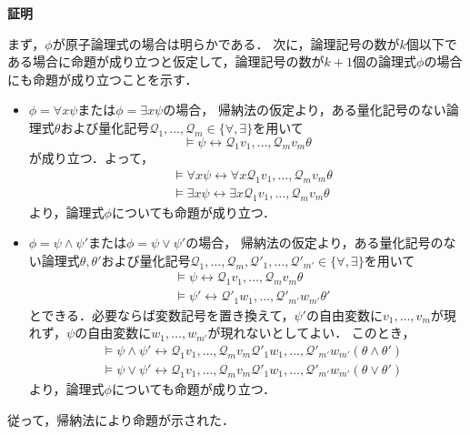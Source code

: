 \documentclass[uplatex, dvipdfmx]{jsarticle}
\makeatletter
\numberwithin{equation}{section}
\renewenvironment{proof}[1][\proofname]{\par
  \pushQED{\qed}%
  \normalfont \topsep6\p@\@plus6\p@\relax
  \trivlist
  \item\relax
  {\bfseries
  #1\@addpunct{.}}\hspace\labelsep\ignorespaces
}{
  \popQED\endtrivlist\@endpefalse
}
\newcommand{\Qua}{\mathcal{Q}}
\theoremstyle{definition}
\renewcommand{\proofname}{\textbf{証明}}
\makeatother
\begin{document}
\begin{proof}
     まず，$\phi$が原子論理式の場合は明らかである．
     次に，論理記号の数が$k$個以下である場合に命題が成り立つと仮定して，論理記号の数が$k+1$個の論理式$\phi$の場合にも命題が成り立つことを示す．
     \begin{itemize}
          \item
               $\phi = \forall x \psi$または$\phi = \exists x \psi$の場合，
               帰納法の仮定より，ある量化記号のない論理式$\theta$および量化記号$\Qua_1, \dots, \Qua_m \in \{\forall, \exists\}$を用いて
               \begin{equation}
                    \models \psi \leftrightarrow \Qua_1 v_1, \dots, \Qua_m v_m \theta
               \end{equation}
               が成り立つ．よって，
               \begin{align}
                    &\models \forall x \psi  \leftrightarrow \forall x \Qua_1 v_1, \dots, \Qua_m v_m \theta\\
                    &\models \exists x \psi  \leftrightarrow \exists x \Qua_1 v_1, \dots, \Qua_m v_m \theta
               \end{align}
               より，論理式$\phi$についても命題が成り立つ．
          \item
               $\phi = \psi \land \psi'$または$\phi = \psi \lor \psi'$の場合，
               帰納法の仮定より，ある量化記号のない論理式$\theta, \theta'$および量化記号$\Qua_1, \dots, \Qua_m, \Qua'_1, \dots, \Qua'_{m'} \in \{\forall, \exists\}$を用いて
               \begin{align}
                    &\models \psi \leftrightarrow \Qua_1 v_1, \dots, \Qua_m v_m \theta\\
                    &\models \psi' \leftrightarrow \Qua'_1 w_1, \dots, \Qua'_{m'} w_{m'} \theta'
               \end{align}
               とできる．必要ならば変数記号を置き換えて，$\psi'$の自由変数に$v_1, \dots, v_m$が現れず，$\psi$の自由変数に$w_1, \dots, w_{m'}$が現れないとしてよい．
               このとき，
               \begin{align}
                    &\models \psi \land \psi' \leftrightarrow \Qua_1 v_1, \dots, \Qua_m v_m \Qua'_1 w_1, \dots, \Qua'_{m'} w_{m'}(\theta \land \theta')\\
                    &\models \psi \lor \psi' \leftrightarrow \Qua_1 v_1, \dots, \Qua_m v_m \Qua'_1 w_1, \dots, \Qua'_{m'} w_{m'}(\theta \lor \theta')
               \end{align}
               より，論理式$\phi$についても命題が成り立つ．
     \end{itemize}
     従って，帰納法により命題が示された．
\end{proof}
\end{document}

